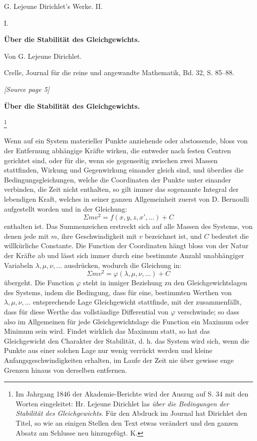 \documentclass[11pt]{article}
\newcommand{\sourcepage}[1]{\par\smallskip\noindent\textit{[Source page #1]}\par\smallskip}
\begin{document}
\begin{center}
{\Large G. Lejeune Dirichlet's Werke. II.}\par\vspace{1.5em}
{\Large I.}\par\vspace{0.5em}
{\LARGE \textbf{Über die Stabilität des Gleichgewichts.}}\par\vspace{1em}
{\large Von G. Lejeune Dirichlet.}\par\vspace{0.5em}
{\small Crelle, Journal für die reine und angewandte Mathematik, Bd. 32, S. 85--88.}
\end{center}

\sourcepage{5}

\begin{center}
\textbf{Über die Stabilität des Gleichgewichts.}
\end{center}

\footnote{Im Jahrgang 1846 der Akademie-Berichte wird der Auszug auf S. 34 mit den Worten eingeleitet: Hr. Lejeune Dirichlet las \emph{über die Bedingungen der Stabilität des Gleichgewichts}. Für den Abdruck im Journal hat Dirichlet den Titel, so wie an einigen Stellen den Text etwas verändert und den ganzen Absatz am Schlusse neu hinzugefügt. K.}

Wenn auf ein System materieller Punkte anziehende oder abstossende, bloss von der Entfernung abhängige Kräfte wirken, die entweder nach festen Centren gerichtet sind, oder für die, wenn sie gegenseitig zwischen zwei Massen stattfinden, Wirkung und Gegenwirkung einander gleich sind, und überdies die Bedingungsgleichungen, welche die Coordinaten der Punkte unter einander verbinden, die Zeit nicht enthalten, so gilt immer das sogenannte Integral der lebendigen Kraft, welches in seiner ganzen Allgemeinheit zuerst von D. Bernoulli aufgestellt worden und in der Gleichung:
\[
\Sigma m v^2 = f(x,y,z,x',\ldots)+C
\]
enthalten ist. Das Summenzeichen erstreckt sich auf alle Massen des Systems, von denen jede mit $m$, ihre Geschwindigkeit mit $v$ bezeichnet ist, und $C$ bedeutet die willkürliche Constante. Die Function der Coordinaten hängt bloss von der Natur der Kräfte ab und lässt sich immer durch eine bestimmte Anzahl unabhängiger Variabeln $\lambda,\mu,\nu,\ldots$ ausdrücken, wodurch die Gleichung in:
\[
\Sigma m v^2 = \varphi(\lambda,\mu,\nu,\ldots)+C
\]
übergeht. Die Function $\varphi$ steht in inniger Beziehung zu den Gleichgewichtslagen des Systems, indem die Bedingung, dass für eine, bestimmten Werthen von $\lambda,\mu,\nu,\ldots$ entsprechende Lage Gleichgewicht stattfinde, mit der zusammenfällt, dass für diese Werthe das vollständige Differential von $\varphi$ verschwinde; so dass also im Allgemeinen für jede Gleichgewichtslage die Function ein Maximum oder Minimum sein wird. Findet wirklich das Maximum statt, so hat das Gleichgewicht den Charakter der Stabilität, d. h. das System wird sich, wenn die Punkte aus einer solchen Lage nur wenig verrückt werden und kleine Anfangsgeschwindigkeiten erhalten, im Laufe der Zeit nie über gewisse enge Grenzen hinaus von derselben entfernen.
\end{document}
